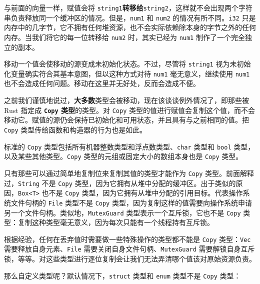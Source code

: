 与前面的向量一样，赋值会将 \texttt{string1}\textbf{转移给}\texttt{string2}，这样就不会出现两个字符串负责释放同一个缓冲区的情况。但是，\texttt{num1} 和 \texttt{num2} 的情况有所不同。\texttt{i32} 只是内存中的几字节，它不拥有任何堆资源，也不会实际依赖除本身的字节之外的任何内存。当我们将它的每一位转移给 \texttt{num2} 时，其实已经为 \texttt{num1} 制作了一个完全独立的副本。

移动一个值会使移动的源变成未初始化状态。不过，尽管将 \texttt{string1} 视为未初始化变量确实符合其基本意图，但以这种方式对待 \texttt{num1} 毫无意义，继续使用 \texttt{num1} 也不会造成任何问题。移动在这里并无好处，反而会造成不便。

之前我们谨慎地说过，\textbf{大多数}类型会被移动，现在该谈谈例外情况了，即那些被 Rust 指定成 \textbf{\texttt{Copy} 类型}的类型。对 \texttt{Copy} 类型的值进行赋值会复制这个值，而不会移动它。赋值的源仍会保持已初始化和可用状态，并且具有与之前相同的值。把 \texttt{Copy} 类型传给函数和构造器的行为也是如此。

标准的 \texttt{Copy} 类型包括所有机器整数类型和浮点数类型、\texttt{char} 类型和 \texttt{bool} 类型，以及某些其他类型。\texttt{Copy} 类型的元组或固定大小的数组本身也是 \texttt{Copy} 类型。

只有那些可以通过简单地复制位来复制其值的类型才能作为 \texttt{Copy} 类型。前面解释过，\texttt{String} 不是 \texttt{Copy} 类型，因为它拥有从堆中分配的缓冲区。出于类似的原因，\texttt{Box<T>} 也不是 \texttt{Copy} 类型，因为它拥有从堆中分配的引用目标。代表操作系统文件句柄的 \texttt{File} 类型不是 \texttt{Copy} 类型，因为复制这样的值需要向操作系统申请另一个文件句柄。类似地，\texttt{MutexGuard} 类型表示一个互斥锁，它也不是 \texttt{Copy} 类型：复制这种类型毫无意义，因为每次只能有一个线程持有互斥锁。

根据经验，任何在丢弃值时需要做一些特殊操作的类型都不能是 \texttt{Copy} 类型：\texttt{Vec} 需要释放自身元素、\texttt{File} 需要关闭自身文件句柄、\texttt{MutexGuard} 需要解锁自身互斥锁，等等。对这些类型进行逐位复制会让我们无法弄清哪个值该对原始资源负责。

那么自定义类型呢？默认情况下，\texttt{struct} 类型和 \texttt{enum} 类型不是 \texttt{Copy} 类型：

